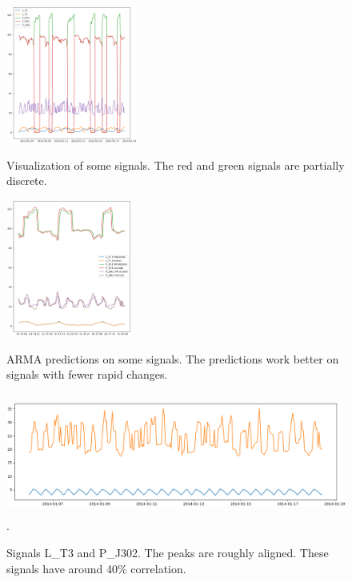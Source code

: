 \documentclass[]{article}
\begin{document}
\begin{center}
\begin{figure}[H]
\begin{minipage}{.475\textwidth}
  \includegraphics[width=1\linewidth, height=4.5cm]{./visuallizations/signals.png}
  \caption{Visualization of some signals. The red and green signals are partially discrete.}
  \label{signals}
\end{minipage} %
\begin{minipage}{.475\textwidth}
  \includegraphics[width=1\linewidth, height=4.5cm]{./visuallizations/predictions.png}
   \caption{ARMA predictions on some signals. The predictions work better on signals with fewer rapid changes.}
  \label{predictions}
\end{minipage}
\begin{minipage}{\textwidth}
  \includegraphics[width=1\linewidth, height=4cm]{./visuallizations/correlated_signals.png}.
  \label{correlation}
  \caption{Signals L\_T3 and P\_J302. The peaks are roughly aligned. These signals have around 40\% correlation.}
\end{minipage}%
\end{figure}
\end{center}
\end{document}
